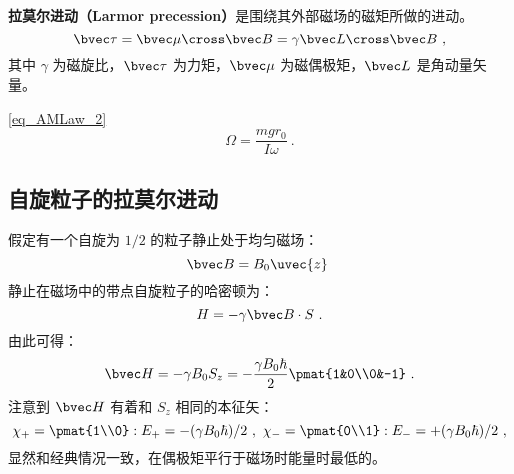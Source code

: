 
\textbf{拉莫尔进动（Larmor precession）}是围绕其外部磁场的磁矩所做的进动。
\begin{equation}
\bvec \tau = \bvec\mu\cross\bvec B=\gamma\bvec L\cross \bvec B~,
\end{equation}
其中 $\gamma$ 为磁旋比，$\bvec\tau$ 为力矩，$\bvec \mu$ 为磁偶极矩，$\bvec L$ 是角动量矢量。


\autoref{eq_AMLaw_2}~
\begin{equation}
\Omega = \frac{mgr_0}{I\omega}~.
\end{equation}

\subsection{自旋粒子的拉莫尔进动}

假定有一个自旋为 $1/2$ 的粒子静止处于均匀磁场：
\begin{equation}
\bvec B =B_0\uvec{z}~
\end{equation}
静止在磁场中的带点自旋粒子的哈密顿为：
\begin{equation}
H = -\gamma\bvec B\cdot S~.
\end{equation}
由此可得：
\begin{equation}
\bvec H = -\gamma B_0S_z=-\frac{\gamma B_0\hbar}{2}\pmat{1&0\\0&-1}~.
\end{equation}
注意到 $\bvec H$ 有着和 $S_z$ 相同的本征矢：
\begin{equation}
\chi_+ = \pmat{1\\0}:E_+=-(\gamma B_0\hbar)/2~,\ \chi_- = \pmat{0\\1}:E_-=+(\gamma B_0\hbar)/2~,
\end{equation}
显然和经典情况一致，在偶极矩平行于磁场时能量时最低的。


